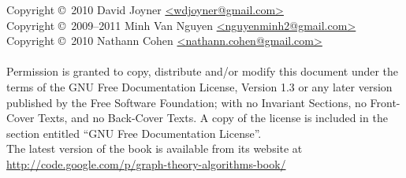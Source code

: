 \noindent Copyright \copyright\ 2010 David Joyner \url{<wdjoyner@gmail.com>} \\
Copyright \copyright\ 2009--2011 Minh Van Nguyen \url{<nguyenminh2@gmail.com>} \\
Copyright \copyright\ 2010 Nathann Cohen \url{<nathann.cohen@gmail.com>} \\\\
Permission is granted to copy, distribute and/or modify this document
under the terms of the GNU Free Documentation License, Version 1.3
or any later version published by the Free Software Foundation;
with no Invariant Sections, no Front-Cover Texts, and no
Back-Cover Texts. A copy of the license is included in the section
entitled ``GNU Free Documentation License''. \\

\noindent
The latest version of the book is available from its website at \\

\url{http://code.google.com/p/graph-theory-algorithms-book/}
